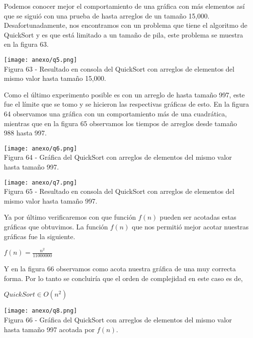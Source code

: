 \documentclass[12pt,twoside]{article}
\begin{document}
Podemos conocer mejor el comportamiento de una gráfica con más elementos así que se siguió con una prueba de hasta arreglos de un tamaño 15,000. Desafortunadamente, nos encontramos con un problema que tiene el algoritmo de QuickSort y es que está limitado a un tamaño de pila, este problema se muestra en la figura 63.
\begin{center}
    \texttt{[image: anexo/q5.png]}\\
    Figura 63 - Resultado en consola del QuickSort con arreglos de elementos del mismo valor hasta tamaño 15,000.
\end{center}
Como el último experimento posible es con un arreglo de hasta tamaño 997, este fue el límite que se tomo y se hicieron las respectivas gráficas de esto. En la figura 64 observamos una gráfica con un comportamiento más de una cuadrática, mientras que en la figura 65 observamos los tiempos de arreglos desde tamaño 988 hasta 997.
\begin{center}
    \texttt{[image: anexo/q6.png]}\\
    Figura 64 - Gráfica del QuickSort con arreglos de elementos del mismo valor hasta tamaño 997.
\end{center}
\begin{center}
    \texttt{[image: anexo/q7.png]}\\
    Figura 65 - Resultado en consola del QuickSort con arreglos de elementos del mismo valor hasta tamaño 997.
\end{center}
Ya por último verificaremos con que función $f(n)$ pueden ser acotadas estas gráficas que obtuvimos. La función $f(n)$ que nos permitió mejor acotar nuestras gráficas fue la siguiente.
\begin{center}
    $f(n) = \frac{n^2}{11000000}$
\end{center}
Y en la figura 66 observamos como acota nuestra gráfica de una muy correcta forma. Por lo tanto se concluiría que el orden de complejidad en este caso es de,
\begin{center}
    $QuickSort \in O(n^2)$
\end{center}
\begin{center}
    \texttt{[image: anexo/q8.png]}\\
    Figura 66 - Gráfica del QuickSort con arreglos de elementos del mismo valor hasta tamaño 997 acotada por $f(n)$.
\end{center}
\end{document}
